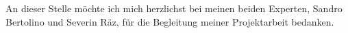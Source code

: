 \documentclass[
  11pt, %
  oneside, %
  ngerman, %
  singlespacing, %
  liststotoc, %
  headsepline, %
]{MastersDoctoralThesis} %
\begin{document}

\begin{acknowledgements}
  \addchaptertocentry{\acknowledgementname} %

  An dieser Stelle möchte ich mich herzlichst bei meinen beiden Experten,
  Sandro Bertolino und Severin Räz, für die Begleitung meiner Projektarbeit
  bedanken.
\end{acknowledgements}


\tableofcontents %

\listoffigures %

\listoftables %

\end{document}
